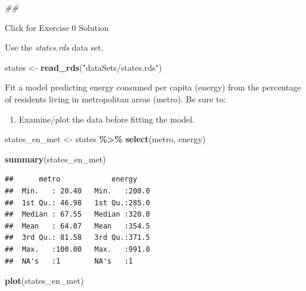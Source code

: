 \documentclass[
]{book}
\newenvironment{Shaded}{\begin{snugshade}}{\end{snugshade}}
\newcommand{\CommentTok}[1]{\textcolor[rgb]{0.56,0.35,0.01}{\textit{#1}}}
\newcommand{\KeywordTok}[1]{\textcolor[rgb]{0.13,0.29,0.53}{\textbf{#1}}}
\newcommand{\NormalTok}[1]{#1}
\newcommand{\OperatorTok}[1]{\textcolor[rgb]{0.81,0.36,0.00}{\textbf{#1}}}
\newcommand{\StringTok}[1]{\textcolor[rgb]{0.31,0.60,0.02}{#1}}
\providecommand{\tightlist}{%
  \setlength{\itemsep}{0pt}\setlength{\parskip}{0pt}}
\begin{document}
\begin{Shaded}
\begin{Highlighting}[]
\CommentTok{\#\# }
\end{Highlighting}
\end{Shaded}

{Click for Exercise 0 Solution}

\begin{alert}

Use the \emph{states.rds} data set.

\begin{Shaded}
\begin{Highlighting}[]
\NormalTok{  states \textless{}{-}}\StringTok{ }\KeywordTok{read\_rds}\NormalTok{(}\StringTok{"dataSets/states.rds"}\NormalTok{)}
\end{Highlighting}
\end{Shaded}

Fit a model predicting energy consumed per capita (energy) from the percentage of residents living in metropolitan areas (metro). Be sure to:

\begin{enumerate}
\def\labelenumi{\arabic{enumi}.}
\tightlist
\item
  Examine/plot the data before fitting the model.
\end{enumerate}

\begin{Shaded}
\begin{Highlighting}[]
\NormalTok{  states\_en\_met \textless{}{-}}\StringTok{ }
\StringTok{      }\NormalTok{states }\OperatorTok{\%\textgreater{}\%}\StringTok{ }
\StringTok{      }\KeywordTok{select}\NormalTok{(metro, energy)}

  \KeywordTok{summary}\NormalTok{(states\_en\_met)}
\end{Highlighting}
\end{Shaded}

\begin{verbatim}
##      metro            energy     
##  Min.   : 20.40   Min.   :200.0  
##  1st Qu.: 46.98   1st Qu.:285.0  
##  Median : 67.55   Median :320.0  
##  Mean   : 64.07   Mean   :354.5  
##  3rd Qu.: 81.58   3rd Qu.:371.5  
##  Max.   :100.00   Max.   :991.0  
##  NA's   :1        NA's   :1
\end{verbatim}

\begin{Shaded}
\begin{Highlighting}[]
  \KeywordTok{plot}\NormalTok{(states\_en\_met)}
\end{Highlighting}
\end{Shaded}


\end{alert}
\end{document}
